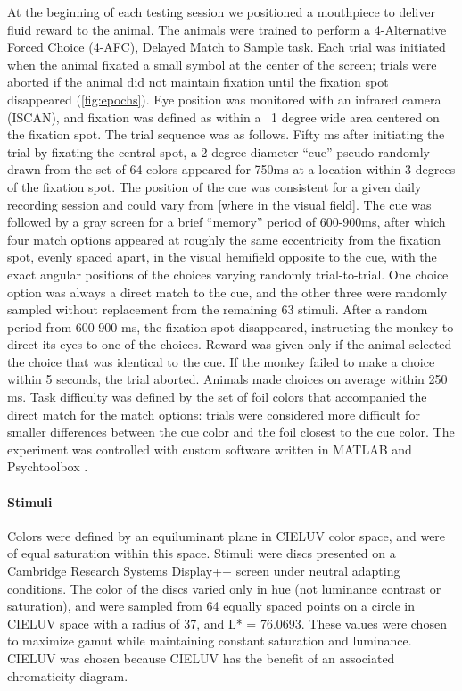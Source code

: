 At the beginning of each testing session we positioned a mouthpiece to deliver fluid reward to the animal.
The animals were trained to perform a 4-Alternative Forced Choice (4-AFC), Delayed Match to Sample task.
Each trial was initiated when the animal fixated a small symbol at the center of the screen; trials were aborted if the animal did not maintain fixation until the fixation spot disappeared (\autoref{fig:epochs}). 
Eye position was monitored with an infrared camera (ISCAN), and fixation was defined as within a ~1 degree wide area centered on the fixation spot. 
The trial sequence was as follows. Fifty ms after initiating the trial by fixating the central spot, a 2-degree-diameter “cue” pseudo-randomly drawn from the set of 64 colors appeared for 750ms at a location within 3-degrees of the fixation spot. 
The position of the cue was consistent for a given daily recording session and could vary from [where in the visual field]. 
The cue was followed by a gray screen for a brief “memory” period of 600-900ms, after which four match options appeared at roughly the same eccentricity from the fixation spot, evenly spaced apart, in the visual hemifield opposite to the cue, with the exact angular positions of the choices varying randomly trial-to-trial. 
One choice option was always a direct match to the cue, and the other three were randomly sampled without replacement from the remaining 63 stimuli. 
After a random period from 600-900 ms, the fixation spot disappeared, instructing the monkey to direct its eyes to one of the choices. 
Reward was given only if the animal selected the choice that was identical to the cue. 
If the monkey failed to make a choice within 5 seconds, the trial aborted.
Animals made choices on average within 250 ms. 
Task difficulty was defined by the set of foil colors that accompanied the direct match for the match options: trials were considered more difficult for smaller differences between the cue color and the foil closest to the cue color. 
The experiment was controlled with custom software written in MATLAB and Psychtoolbox \citep{noauthor_nei-lsrkofiko_2022, kleiner_whats_2007}.

\paragraph{Stimuli}
Colors were defined by an equiluminant plane in CIELUV color space, and were of equal saturation within this space. 
Stimuli were discs presented on a Cambridge Research Systems Display++ screen under neutral adapting conditions.%
The color of the discs varied only in hue (not luminance contrast or saturation), and were sampled from 64 equally spaced points on a circle in CIELUV space with %
a radius of 37, and %
L* = 76.0693.%
These values were chosen to maximize gamut while maintaining constant saturation and luminance. 
CIELUV was chosen because CIELUV has the benefit of an associated chromaticity diagram. 

